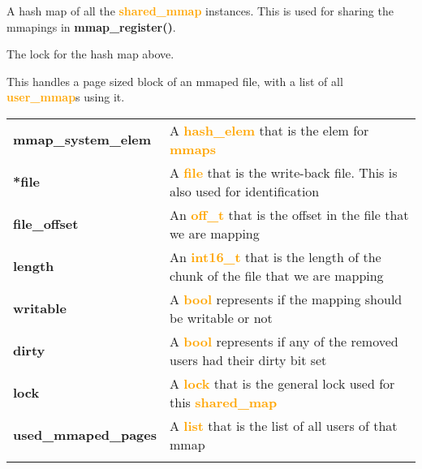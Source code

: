 \documentclass{report}
\newcommand{\fun}[1]{\textcolor{Emerald}{\textbf{#1}}}
\newcommand{\file}[1]{\textcolor{YellowGreen}{\textbf{#1}}}
\newcommand{\struct}[1]{\textcolor{orange}{\textbf{#1}}}
\newcommand{\var}[1]{\textcolor{RoyalPurple}{\textbf{#1}}}
\newcommand{\pintoscode}[4]{}
\newcommand{\pintosfile}[3]{\pintoscode{#1}{#2}{\file{#3}}{#3}}
\begin{document}
				\pintosfile{37}{37}{mmap.c}
				A hash map of all the \struct{shared\_mmap} instances. This is used for 
				sharing the mmapings in \fun{mmap\_register()}.

				\pintosfile{40}{40}{mmap.c} 
				The lock for the hash map above.
				
				\pintosfile{45}{57}{mmap.c}
				This handles a page sized block of an mmaped file, with a list of all 
				\struct{user\_mmap}s using it. \\
				\begin{center}
					\begin{tabular}{l p{10cm}}
							\vspace*{2mm}
							\var{mmap\_system\_elem}  & A \struct{hash\_elem} that is the elem for \struct{mmaps} \\ \vspace*{2mm}
							\var{*file}               & A \struct{file} that is the write-back file. This is also used for identification \\ \vspace*{2mm}
							\var{file\_offset}        & An \struct{off\_t} that is the offset in the file that we are mapping \\ \vspace*{2mm}
							\var{length}              & An \struct{int16\_t} that is the length of the chunk of the file that we are mapping \\ \vspace*{2mm}
							\var{writable}            & A \struct{bool} represents if the mapping should be writable or not \\ \vspace*{2mm}
							\var{dirty}               & A \struct{bool} represents if any of the removed users had their dirty bit set \\ \vspace*{2mm}
							\var{lock}                & A \struct{lock} that is the general lock used for this \struct{shared\_map}\\ \vspace*{2mm}
							\var{used\_mmaped\_pages} & A \struct{list} that is the list of all users of that mmap \\ \vspace*{2mm}
					\end{tabular}
				\end{center}
				
\end{document}
